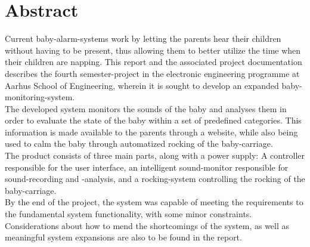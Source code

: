 \chapter{Abstract}

Current baby-alarm-systems work by letting the parents hear their children without having to be present, thus allowing them to better utilize the time when their children are napping.
This report and the associated project documentation describes the fourth semester-project in the electronic engineering programme at Aarhus School of Engineering, wherein it is sought to develop an expanded baby-monitoring-system.\\
The developed system monitors the sounds of the baby and analyses them in order to evaluate the state of the baby within a set of predefined categories. This information is made available to the parents through a website, while also being used to calm the baby through automatized rocking of the baby-carriage.\\
The product consists of three main parts, along with a power supply: A controller responsible for the user interface, an intelligent sound-monitor responsible for sound-recording and -analysis, and a rocking-system controlling the rocking of the baby-carriage.\\
By the end of the project, the system was capable of meeting the requirements to the fundamental system functionality, with some minor constraints. Considerations about how to mend the shortcomings of the system, as well as meaningful system expansions are also to be found in the report.\\


